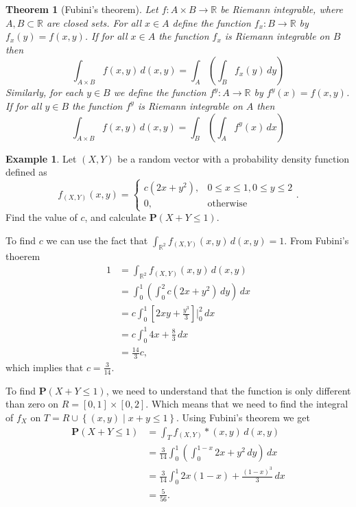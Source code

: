\documentclass[11pt,a4paper]{article}
\theoremstyle{definition}
\newtheorem{example}{Example}[section]
\theoremstyle{plain}
\newtheorem{theorem}{Theorem}[section]
\newcommand{\R}{\mathbb{R}}
\newcommand{\set}[2]{ \left\{ #1 \mid #2 \right\} }
\begin{document}
  \begin{theorem}[Fubini's theorem]
    Let $f \colon A \times B \to \R$ be Riemann integrable, where 
    $A,B \subset \R$ are closed sets.
    For all $x \in A$ define the function $f_x \colon B \to \R$ by
    $f_x(y) = f(x,y)$.
    If for all $x \in A$ the function $f_x$ is Riemann integrable on $B$
    then
    \[
      \int_{A \times B} f(x,y)\,d(x,y) =
      \int_{A}\left(\int_{B} f_x(y)\,dy\right)
    \]
    Similarly, for each $y \in B$ we define the function 
    $f^y \colon A \to \R$ by $f^y(x) = f(x,y)$.
    If for all $y \in B$ the function $f^y$ is Riemann integrable on $A$
    then
    \[
      \int_{A \times B} f(x,y)\,d(x,y) =
      \int_{B}\left(\int_{A} f^y(x)\,dx\right)
    \]
  \end{theorem}
  \begin{example}
    Let $(X,Y)$ be a random vector with a probability density function
    defined as
    \[
      f_{(X,Y)}(x,y) =
      \begin{cases}
        c(2x+y^2), & 0 \le x \le 1, 0 \le y \le 2 \\
        0, &\text{otherwise}
      \end{cases}.
    \]
    Find the value of $c$, and calculate $\mathbf P(X + Y \le 1)$.

    To find $c$ we can use the fact that 
    $\int_{\R^2} f_{(X,Y)}(x,y)\,d(x,y) = 1$.
    From Fubini's thoerem
    \begin{align*}
      1 &= \int_{\R^2} f_{(X,Y)}(x,y)\,d(x,y) \\
      &= \int_{0}^{1}\left(\int_{0}^{2} c(2x + y^2)\,dy\right)\,dx \\
      &= c \int_{0}^{1} \left[2xy + \frac{y^3}{3}\right]\biggr\vert^2_0\,dx \\
      &= c \int_{0}^{1} 4x + \frac{8}{3}\,dx \\
      &= \frac{14}{3}c,
    \end{align*}
    which implies that $c = \frac{3}{14}$.

    To find $\mathbf P(X + Y \le 1)$, we need to understand that the function
    is only different than zero on $R = [0,1] \times [0,2]$. Which means that
    we need to find the integral of $f_X$ on 
    $T = R \cup \set{(x,y)}{x + y \le 1}$. 
    Using Fubini's theorem we get
    \begin{align*}
      \mathbf P(X + Y \le 1) &= \int_{T}f_{(X,Y)}*(x,y)\,d(x,y) \\
      &= \frac{3}{14} \int_{0}^{1} 
      \left(\int_{0}^{1-x} 2x + y^2\,dy\right)\,dx \\
      &= {\frac{3}{14}}\int_{0}^{1}2x(1-x)+{\frac{(1-x)^{3}}{3}}\,dx \\
      &= {\frac{5}{56}}.
    \end{align*}
  \end{example}
\end{document}
